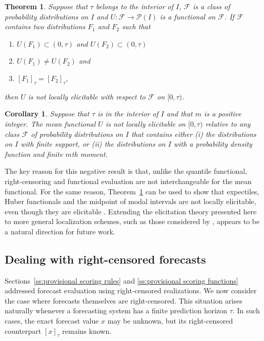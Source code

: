 \documentclass[10pt]{article} %
\theoremstyle{theorem}
\newtheorem{thm}{Theorem}
\newtheorem{cor}{Corollary}
\theoremstyle{definition}
\begin{document}
\begin{thm}\label{thm:not prov elic}
Suppose that $\tau$ belongs to the interior of $I$, $\mathcal{F}$ is a class of probability distributions on $I$ and $U:\mathcal{F}\to\mathcal{P}(I)$ is a functional on $\mathcal{F}$. If $\mathcal{F}$ contains two distributions $F_1$ and $F_2$ such that
\begin{enumerate}
\item[(a)] $U(F_1) \subset(0,\tau)$ and $U(F_2) \subset(0,\tau)$ 
\item[(b)] $U(F_1) \neq U(F_2)$ and
\item[(c)] $[F_1]_\tau = [F_2]_\tau$,
\end{enumerate}
then $U$ is not locally elicitable with respect to $\mathcal{F}$ on $[0,\tau)$.
\end{thm}

\begin{cor}\label{cor:expectation not provisionally elicitable}
Suppose that $\tau$ is in the interior of $I$ and that $m$ is a positive integer. The mean functional $U$ is not locally elicitable on $[0,\tau)$ relative to any class $\mathcal{F}$ of probability distributions on $I$ that contains either (i) the distributions on $I$ with finite support, or (ii) the distributions on $I$ with a probability density function and finite $m$th moment.
\end{cor}

The key reason for this negative result is that, unlike the quantile functional, right-censoring and functional evaluation are not interchangeable for the mean functional. For the same reason, Theorem~\ref{thm:not prov elic} can be used to show that expectiles, Huber functionals and the midpoint of modal intervals are not locally elicitable, even though they are elicitable \citep{gneiting2011making, taggart2022point, ferguson1967mathematical, lehmann1998theory}. Extending the elicitation theory presented here to more general localization schemes, such as those considered by \citet{de2025localizing}, appears to be a natural direction for future work.


\subsection{Dealing with right-censored forecasts}\label{ss:right-censored forecasts}

Sections~\ref{ss:provisional scoring rules} and \ref{ss:provisional scoring functions} addressed forecast evaluation using right-censored realizations. We now consider the case where forecasts themselves are right-censored. This situation arises naturally whenever a forecasting system has a finite prediction horizon $\tau$. In such cases, the exact forecast value $x$ may be unknown, but its right-censored counterpart $[x]_\tau$ remains known.
\end{document}
